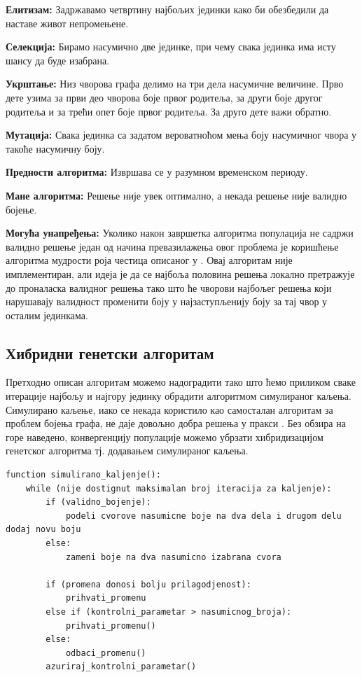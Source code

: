 \documentclass[a4paper]{article}
\begin{document}
{\textbf{Елитизам:} Задржавамо четвртину најбољих јединки како би обезбедили да наставе живот непромењене.

\textbf{Селекција:} Бирамо насумично две јединке, при чему свака јединка има исту шансу да буде изабрана.

\textbf{Укрштање:} Низ чворова графа делимо на три дела насумичне величине. Прво дете узима за први део чворова боје првог родитеља, за други боје другог родитеља и за трећи опет боје првог родитеља. За друго дете важи обратно.

\textbf{Мутација:} Свака јединка са задатом вероватноћом мења боју насумичног чвора у такоће насумичну боју.

\textbf{Предности алгоритма:} Извршава се у разумном временском периоду.

\textbf{Мане алгоритма:} Решење није увек оптимално, а некада решење није валидно бојење.

\textbf{Могућа унапређења:} Уколико након завршетка алгоритма популација не садржи валидно решење један од начина превазилажења овог проблема је коришћење алгоритма мудрости роја честица описаног у \cite{wisdom}. Овај алгоритам није имплементиран, али идеја је да се најбоља половина решења локално претражује до проналаска валидног решења тако што ће чворови најбољег решења који нарушавају валидност променити боју у најзаступљенију боју за тај чвор у осталим јединкама.

\subsection{Хибридни генетски алгоритам}
Претходно описан алгоритам можемо надоградити тако што ћемо приликом сваке итерације најбољу и најгору јединку обрадити алгоритмом симулираног каљења. Симулирано каљење, иако се некада користило као самосталан алгоритам за проблем бојења графа, не даје довољно добра решења у пракси \cite{annealing}. Без обзира на горе наведено, конвергенцију популације можемо убрзати хибридизацијом генетског алгоритма тј. додавањем симулираног каљења.

\begin{lstlisting}[caption={Псеудо-код симулираног каљења},frame=single]
function simulirano_kaljenje():
	while (nije dostignut maksimalan broj iteracija za kaljenje):
		if (validno_bojenje):
			podeli cvorove nasumicne boje na dva dela i drugom delu dodaj novu boju
		else:
			zameni boje na dva nasumicno izabrana cvora
		
		if (promena donosi bolju prilagodjenost):
			prihvati_promenu
		else if (kontrolni_parametar > nasumicnog_broja):
			prihvati_promenu()
		else:
			odbaci_promenu()
		azuriraj_kontrolni_parametar()
\end{lstlisting}

}
\end{document}
